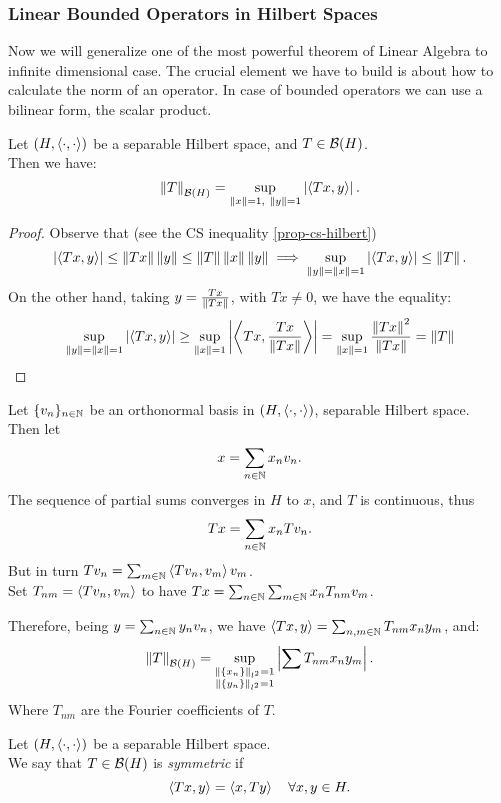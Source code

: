 \subsubsection{Linear Bounded Operators in Hilbert Spaces}
Now we will generalize one of the most powerful theorem of Linear Algebra to infinite dimensional case. The crucial element we have to build is about how to calculate the norm of an operator. In case of bounded operators we can use a bilinear form, the scalar product.

\begin{prop}
	Let $(H,\left\langle\cdot, \cdot\right\rangle )$ be a separable Hilbert space, and $T \in \mathcal B(H)$.\\
	Then we have:
	$$
	\left\lVert T\right\rVert_{\mathcal B(H)} 
	= \sup_{\left\lVert x\right\rVert=1, \ \left\lVert y\right\rVert=1} 
	\left\lvert\left\langle Tx,y\right\rangle\right\rvert
	.
	$$
\end{prop}
\begin{proof}
	Observe that (see the CS inequality \vref{prop-cs-hilbert})
	$$
	\left\lvert\left\langle Tx,y\right\rangle\right\rvert
	\leq \left\lVert Tx\right\rVert\left\lVert y\right\rVert
	\leq \left\lVert T\right\rVert\left\lVert x\right\rVert\left\lVert y\right\rVert
	\implies 
	\sup_{\left\lVert y\right\rVert=\left\lVert x\right\rVert=1} \left\lvert\left\langle Tx,y\right\rangle\right\rvert \leq \left\lVert T\right\rVert
	.
	$$
	On the other hand, taking $y=\frac{Tx}{\left\lVert Tx\right\rVert}$, with $Tx \neq 0$, we have the equality:
	$$
		\sup_{\left\lVert y\right\rVert=\left\lVert x\right\rVert=1} \left\lvert\left\langle Tx,y\right\rangle\right\rvert
		\geq \sup_{\left\lVert x\right\rVert=1} \left\lvert\left\langle Tx,\frac{Tx}{\left\lVert Tx\right\rVert}\right\rangle\right\rvert
		= \sup_{\left\lVert x\right\rVert=1} \frac{\left\lVert Tx\right\rVert^2}{\left\lVert Tx\right\rVert}
		= \left\lVert T\right\rVert
	$$
\end{proof}

Let $\{v_n\}_{n\in\mathbb N}$ be an orthonormal basis in $(H, \left\langle\cdot, \cdot\right\rangle)$, separable Hilbert space.\\
Then let 
$$
x 
= \sum_{n \in \mathbb N} x_n v_n
.
$$
The sequence of partial sums converges in $H$ to $x$, and $T$ is continuous, thus 
$$Tx 
= \sum_{n \in \mathbb N} x_n T v_n
.
$$
But in turn $Tv_n = \sum_{m \in \mathbb N} \left\langle Tv_n, v_m\right\rangle v_m$.\\
Set $T_{nm} = \left\langle Tv_n,v_m\right\rangle$ to have $Tx = \sum_{n \in \mathbb N}\sum_{m \in \mathbb N} x_nT_{nm}v_m$.
	
Therefore, being $y = \sum_{n \in \mathbb N} y_n v_n$, we have $\left\langle Tx,y\right\rangle = \sum_{n,m \in \mathbb N} T_{nm} x_n y_m$, and:
$$
\left\lVert T\right\rVert_{\mathcal B(H)} 
= \sup_{\substack{\left\lVert\{x_n\}\right\rVert_{l^2}=1 \\
	\left\lVert\{y_n\}\right\rVert_{l^2}=1}}
\left\lvert\sum T_{nm} x_n y_m\right\rvert
.$$
Where $T_{nm}$ are the Fourier coefficients of $T$.
	
\begin{defn}
	Let $(H,\left\langle\cdot, \cdot\right\rangle )$ be a separable Hilbert space.\\
	We say that $T \in \mathcal B(H)$ is \emph{symmetric} if 
	$$
	\left\langle Tx,y\right\rangle  
	= \left\langle x,Ty\right\rangle  
	\quad \forall x,y \in H
	.
	$$
\end{defn}

